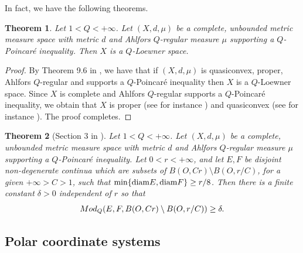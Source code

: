 \documentclass[10pt]{amsart}
\newtheorem{theorem}{Theorem}[section]
\numberwithin{equation}{section}
\newcommand{\diam}{\text{\rm diam}}
\begin{document}
In fact, we have the following theorems.
\begin{theorem}\label{thm2.6-0709}
Let $1<Q<+\infty$.
 Let $(X,d,\mu)$ be a complete, unbounded metric measure space with metric $d$ and Ahlfors $Q$-regular measure $\mu$ supporting a $Q$-Poincar\'e inequality. 
Then $X$ is a $Q$-Loewner space.
\end{theorem}
\begin{proof}
By Theorem 9.6 in \cite{Hei01}, we have that if $(X,d,\mu)$ is quasiconvex, proper, Ahlfors $Q$-regular and supports a $Q$-Poincar\'e inequality then $X$ is a $Q$-Loewner space. Since $X$ is complete and Ahlfors $Q$-regular supports a $Q$-Poincar\'e inequality, we obtain that $X$ is proper (see for instance \cite[Lemma 4.1.14]{pekka}) and quasiconvex (see for instance \cite[Theorem 8.3.2]{pekka}). The proof completes.
\end{proof}
\begin{theorem} [Section 3 in \cite{HK98}] \label{thm2.7-0709}
 Let $1<Q<+\infty$.
 Let $(X,d,\mu)$ be a complete, unbounded metric measure space with metric $d$ and Ahlfors $Q$-regular measure $\mu$ supporting a $Q$-Poincar\'e inequality. 
Let $0<r<+\infty$, and let $E,F$ be disjoint non-degenerate continua which are subsets of $B(O,Cr)\setminus B(O,r/C)$, for a given $+\infty>C>1$, such that $\min\{\diam E,\diam F\}\ge r/8$. Then there is a finite constant $\delta>0$ independent of $r$ so that 
 \[
 	{\rm Mod}_Q(E,F, B(O,Cr)\setminus B(O,r/C)) \geq \delta.
 \]
\end{theorem}


\subsection{Polar coordinate systems}\label{polar} \ 
\end{document}
